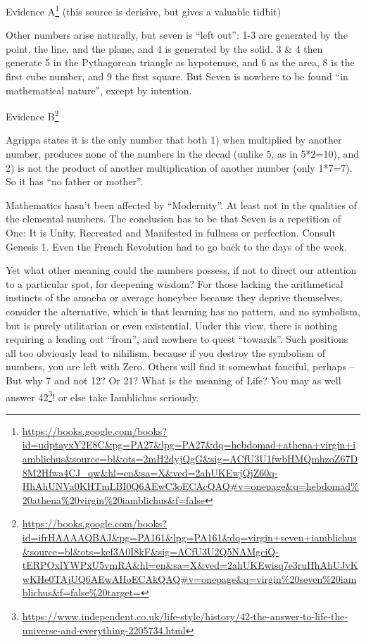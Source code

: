 \begin{quotationx}
Evidence A\footnote{\url{https://books.google.com/books?id=udptayxY2E8C\&pg=PA27\&lpg=PA27\&dq=hebdomad+athena+virgin+iamblichus\&source=bl\&ots=2mH2dyjQgG\&sig=ACfU3U1fwbHMQmhzoZ67D8M2Hfwa4CJ_qw\&hl=en\&sa=X\&ved=2ahUKEwjQjZ60q-HhAhUNVa0KHTmLBI0Q6AEwC3oECAcQAQ\#v=onepage\&q=hebdomad\%20athena\%20virgin\%20iamblichus\&f=false}} (this source is derisive, but gives a valuable tidbit)

Other numbers arise naturally, but seven is ``left out'': 1-3 are generated by the point, the line, and the plane, and 4 is generated by the solid. 3 \& 4 then generate 5 in the Pythagorean triangle as hypotenuse, and 6 as the area, 8 is the first cube number, and 9 the first square. But Seven is nowhere to be found ``in mathematical nature'', except by intention.

Evidence B\footnote{\url{https://books.google.com/books?id=ifrHAAAAQBAJ\&pg=PA161\&lpg=PA161\&dq=virgin+seven+iamblichus\&source=bl\&ots=kef3A0I8kF\&sig=ACfU3U2Q5NAMgciQ-tERPOxlYWPxU5vmRA\&hl=en\&sa=X\&ved=2ahUKEwisq7e3ruHhAhUJvKwKHe0TAjUQ6AEwAHoECAkQAQ\#v=onepage\&q=virgin\%20seven\%20iamblichus\&f=false\%20target=}}

Agrippa states it is the only number that both 1) when multiplied by another number, produces none of the numbers in the decad (unlike 5, as in 5*2=10), and 2) is not the product of another multiplication of another number (only 1*7=7). So it has ``no father or mother''.
\end{quotationx}


Mathematics hasn't been affected by ``Modernity''. At least not in the qualities of the elemental numbers. The conclusion has to be that Seven is a repetition of One: It is Unity, Recreated and Manifested in fullness or perfection. Consult Genesis 1. Even the French Revolution had to go back to the days of the week.

Yet what other meaning could the numbers possess, if not to direct our attention to a particular spot, for deepening wisdom? For those lacking the arithmetical instincts of the amoeba or average honeybee because they deprive themselves, consider the alternative, which is that learning has no pattern, and no symbolism, but is purely utilitarian or even existential. Under this view, there is nothing requiring a leading out ``from'', and nowhere to quest ``towards''. Such positions all too obviously lead to nihilism, because if you destroy the symbolism of numbers, you are left with Zero. Others will find it somewhat fanciful, perhaps -- But why 7 and not 12? Or 21? What is the meaning of Life? You may as well answer 42\footnote{\url{https://www.independent.co.uk/life-style/history/42-the-answer-to-life-the-universe-and-everything-2205734.html}}! or else take Iamblichus seriously.

